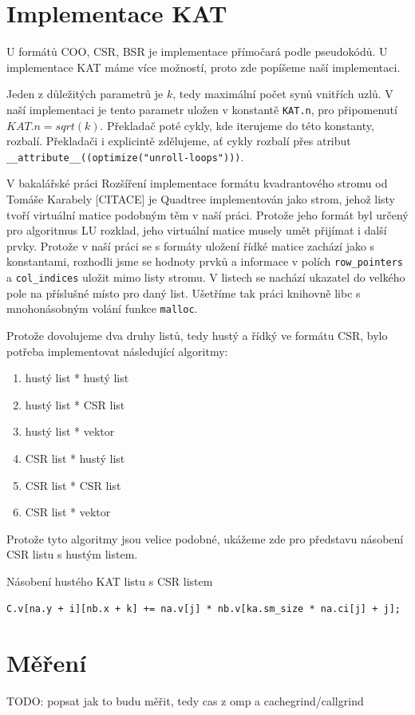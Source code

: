 \section{Implementace KAT}

U formátů COO, CSR, BSR je implementace přímočará podle pseudokódů. U implementace KAT máme více možností, proto zde popíšeme naší implementaci.

Jeden z důležitých parametrů je $k$, tedy maximální počet synů vnitřích uzlů. V naší implementaci je tento parametr uložen v konstantě \texttt{KAT.n}, pro připomenutí $KAT.n = sqrt(k)$. Překladač poté cykly, kde iterujeme do této konstanty, rozbalí. Překladači i explicintě zdělujeme, ať cykly rozbalí přes atribut \texttt{\_\_attribute\_\_((optimize("unroll-loops")))}.

V bakalářské práci Rozšíření implementace formátu kvadrantového stromu od Tomáše Karabely [CITACE] je Quadtree implementován jako strom, jehož listy tvoří virtuální matice podobným těm v naší práci. Protože jeho formát byl určený pro algoritmus LU rozklad, jeho virtuální matice musely umět přijímat i další prvky. Protože v naší práci se s formáty uložení řídké matice zachází jako s konstantami, rozhodli jsme se hodnoty prvků a informace v polích \texttt{row\_pointers} a \texttt{col\_indices} uložit mimo listy stromu. V listech se nachází ukazatel do velkého pole na příslušné místo pro daný list. Ušetříme tak práci knihovně libc s mnohonásobným volání funkce \texttt{malloc}.

Protože dovolujeme dva druhy listů, tedy hustý a řídký ve formátu CSR, bylo potřeba implementovat následující algoritmy:

\begin{enumerate}
  \item hustý list * hustý list
  \item hustý list * CSR list
  \item hustý list * vektor
  \item CSR list * hustý list
  \item CSR list * CSR list
  \item CSR list * vektor
\end{enumerate}

Protože tyto algoritmy jsou velice podobné, ukážeme zde pro představu násobení CSR listu s hustým listem.

\begin{algorithm}[H]
	\caption{Násobení hustého KAT listu s CSR listem}\label{kat-mmm-den-csr}
	\begin{algorithmic}[1]
					\State \texttt{C.v[na.y + i][nb.x + k] += na.v[j] * nb.v[ka.sm\_size * na.ci[j] + j];}
				\EndFor
			\EndFor
		\EndFor
		\EndProcedure
	\end{algorithmic}
\end{algorithm}

\section{Měření}

TODO: popsat jak to budu měřit, tedy cas z omp a cachegrind/callgrind